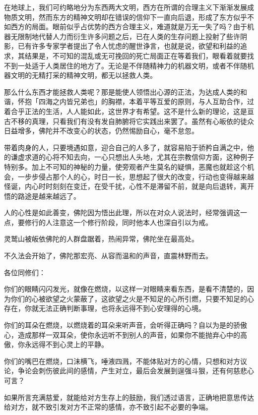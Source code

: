 \documentclass[12pt,twoside,openany]{book}
\begin{document}
在地球上，我们可约略地分为东西两大文明，西方在所谓的合理主义下渐渐发展成物质文明，然而东方的精神文明却在错误的信仰下一直向后退，形成了东方似乎不如西方的局面。眼前似乎占优势的西方合理主义，难道就是万无一失了吗？由于机器无限制地代替人力而衍生许多问题之后，已在人类的生存问题上投射了些许阴影，已有许多专家学者提出了令人忧虑的醒世诤言，也就是说，欲望和利益的追求，其结果是，不可知的混乱或无可挽回的死亡局面正在等着我们，眼看着就要找不到一处适于人类居住的地方了。无论是不伴随精神力的机器文明，或者不伴随机器文明的无精打采的精神文明，都无以拯救人类。

那么什么东西才能拯救人类呢？那是能使人领悟出心源的正法，为达成人类的和谐，怀抱「四海之内皆兄弟也」的胸襟，本着平等互爱的原则，与人互助合作，过着合乎正法的生活，人人能如此，这世界才有希望。这不是什么新的理论，这是亘古不移的真理，只看我们有没有发自肺腑将它实践出来罢了。虽然有心皈依的徒众日益增多，佛陀并不改变心的状态，仍然惕励自心，毫不怠忽。

带着肉身的人，只要境遇如意，迎合自己的人多了，就容易陷于骄矜自满之中，他的谦虚求道的心将不知去向，一心只想出人头地，尤其在宗教信仰方面，这种例子特别多。加上不可知的神秘的力量，使旁观者产生莫名的疑惧，恶魔也就趁这个机会，一步步侵占那个人的心，时日一长，思想起了很大的改变，行动也变得越来越怪诞，内心时时刻刻在变迁，在受千扰，心性不是滞留不前，就是向后退转，离开悟的路途是越来越远了。

人的心性是如此善变，佛陀因为悟出此理，所以在对众人说法时，经常强调这一点，要修行的人注意这一个修行阶段，同时他本人也深自引以为戒。

灵鹫山被皈依佛陀的人群盘踞着，热闹异常，佛陀坐在最高处。

不久法会开始了，佛陀那宏亮、从容而温和的声音，直震林野而去。

各位同修们：

你们的眼睛闪闪发光，就像在燃烧，以这样一对眼睛来看东西，是看不清楚的，因为你们的心被欲望之火蒙蔽了，这欲望之火是不知足的心所引燃，只要不知足的心存在，你就无法正确判断事理，也将永远得不到心安理得的心境。

你们的耳朵在燃烧，以燃烧着的耳朵来听声音，会听得正确吗？自以为是的骄傲心，造成那样一双耳朵，使你永远听不到别人的声音，如果你不能抛弃心中的高傲，你永远得不到心灵上的平静。

你们的嘴巴在燃烧，口沬横飞，唾液四溅，不能体贴对方的心情，只想和对方议论，争论会刺伤彼此间的感情，产生对立，最后会发展到逞强斗狠，还有何慈悲心可言？

如果所言充满慈爱，就能给对方生存上的鼓励，我们透过语言，正确地把意思传达给对方，就不致引发对方不正常的感情，亦不致引起不必要的争端。
\end{document}
